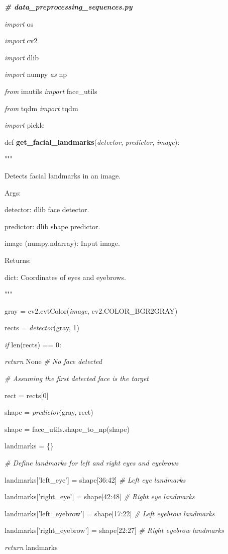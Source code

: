 \documentclass[
]{article}
\begin{document}
\emph{\textbf{\# data\_preprocessing\_sequences.py}}

\emph{import} os

\emph{import} cv2

\emph{import} dlib

\emph{import} numpy \emph{as} np

\emph{from} imutils \emph{import} face\_utils

\emph{from} tqdm \emph{import} tqdm

\emph{import} pickle

def \textbf{get\_facial\_landmarks}(\emph{detector}, \emph{predictor}, \emph{image}):

"""

Detects facial landmarks in an image.

Args:

detector: dlib face detector.

predictor: dlib shape predictor.

image (numpy.ndarray): Input image.

Returns:

dict: Coordinates of eyes and eyebrows.

"""

gray = cv2.cvtColor(\emph{image}, cv2.COLOR\_BGR2GRAY)

rects = \emph{detector}(gray, 1)

\emph{if} len(rects) == 0:

\emph{return} None \emph{\# No face detected}

\emph{\# Assuming the first detected face is the target}

rect = rects{[}0{]}

shape = \emph{predictor}(gray, rect)

shape = face\_utils.shape\_to\_np(shape)

landmarks = \{\}

\emph{\# Define landmarks for left and right eyes and eyebrows}

landmarks{[}'left\_eye'{]} = shape{[}36:42{]} \emph{\# Left eye landmarks}

landmarks{[}'right\_eye'{]} = shape{[}42:48{]} \emph{\# Right eye landmarks}

landmarks{[}'left\_eyebrow'{]} = shape{[}17:22{]} \emph{\# Left eyebrow landmarks}

landmarks{[}'right\_eyebrow'{]} = shape{[}22:27{]} \emph{\# Right eyebrow landmarks}

\emph{return} landmarks
\end{document}
